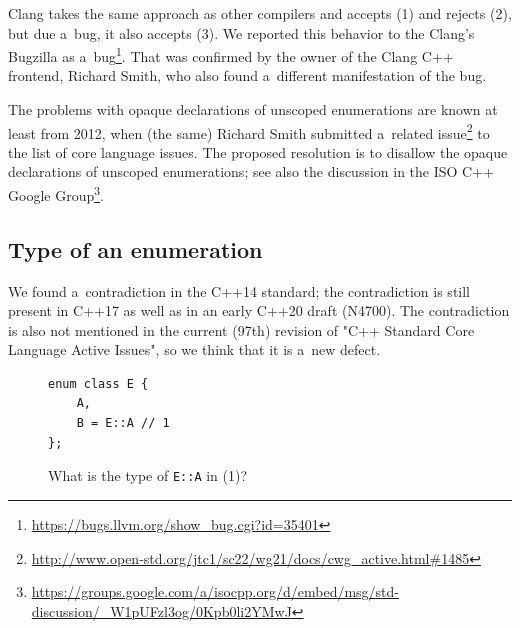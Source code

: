 \documentclass[nolot,nolof,nocover,printed]{fithesis3}
\begin{document}
Clang takes the same approach as other compilers and accepts (1) and rejects (2), but due a~bug, it also accepts (3). We reported this behavior to the Clang's Bugzilla as a~bug\footnote{\url{https://bugs.llvm.org/show_bug.cgi?id=35401}}. That was confirmed by the owner of the Clang C++ frontend, Richard Smith, who also found a~different manifestation of the bug.

The problems with opaque declarations of unscoped enumerations are known at least from 2012, when (the same) Richard Smith submitted a~related issue\footnote{\url{http://www.open-std.org/jtc1/sc22/wg21/docs/cwg\_active.html\#1485}} to the list of core language issues. The proposed resolution is to disallow the opaque declarations of unscoped enumerations; see also the discussion in the ISO C++ Google Group\footnote{\url{https://groups.google.com/a/isocpp.org/d/embed/msg/std-discussion/\_W1pUFzl3og/0Kpb0li2YMwJ}}.


\subsection{Type of an enumeration}

We found a~contradiction in the C++14 standard; the contradiction is still present in C++17 as well as in an early C++20 draft (N4700).
The contradiction is also not mentioned in the current (97th) revision of "C++ Standard Core Language Active Issues", so we think that it is a~new defect.

\begin{figure}[ht]
\begin{lstlisting}
enum class E {
    A,
    B = E::A // 1
};
\end{lstlisting}
\caption{What is the type of \lstinline|E::A| in (1)?}
\label{fig:typeOfAQualifiedEnumerator}
\end{figure}
\end{document}
